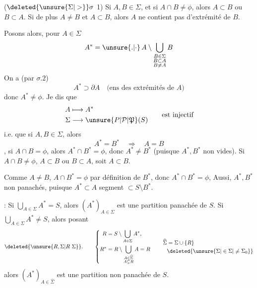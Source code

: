 ($\deleted{\unsure{\Sigma|>}}\sigma$ 1) Si $A,B\in\Sigma$, et si $A\cap B\ne\phi$, alors $A\subset B$ ou $B\subset A$.  Si de plus $A\ne B$ et $A\subset B$, alors $A$ ne contient pas d'extrémité de $B$.

Posons alors, pour $A\in\Sigma$
\[
 A^*=\unsure{.|\cdot}\, A\setminus\bigcup_{\substack{B\in\Sigma\\ B\subset A\\ B\ne A}} B
\]
On a (par $\sigma.2$)
\[
 A^*\supset\partial A\quad\text{(ens des extrémités de $A$)}
\]
donc $A^*\ne\phi$. Je dis que
\[
 \begin{aligned}
 A&\longmapsto A^*\\
 \Sigma&\longrightarrow \unsure{P|\mathcal P|\mathfrak P}(S)
 \end{aligned}
 \qquad\text{est injectif}
\]
i.e. que si $A,B\in\Sigma$, alors
\[
 A^*=B^*\quad\Longrightarrow\quad A=B
\]
 , si $A\cap B=\phi$, alors $A^*\cap B^*=\phi$, donc $A^*\ne B^*$ (puisque $A^*,B^*$ non vides). Si $A\cap B\ne\phi$,   $A\subset B$ ou $B\subset A$, soit $A\subset B$.

 Comme $A\ne B$, $A\cap B^*=\phi$ par définition de $B^*$, donc $A^*\cap B^*=\phi$,   Aussi, $A^*,B^*$ non panachés, puisque $A^*\subset A$ segment $\subset S\setminus B^*$.

\uline{}: Si $\bigcup_{A\in\Sigma}A^*=S$, alors  $(A^*)_{A\in\Sigma}$ est une partition   panachée de $S$. Si $\bigcup_{A\in\Sigma}A^*\ne S$, alors posant
\[
 \deleted{\unsure{R,\Sigma|R\ \Sigma}}\mathpunct{.}\qquad
 \left\{\begin{aligned}
 R&=S\setminus\bigcup_{A\in\Sigma}A^*,\\
 R^*&=R\setminus\bigcup_{\substack{A\in\widehat\Sigma\\ A\subsetneq R}}A=R
 \end{aligned}\right.\qquad
 \begin{aligned}
 \widehat\Sigma&=\Sigma\cup\{R\}\\
 &\deleted{\unsure{\Sigma|\in\Sigma|\ne\Sigma_0}}
 \end{aligned}
\]
alors $(A^*)_{A\in\widehat\Sigma}$ est une partition non panachée de $S$.

